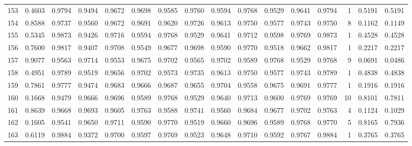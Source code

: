 \begin{tabular}{lrrrrrrrrrrrrrrr}
153 &      0.4603 &  0.9794 &  0.9494 &  0.9672 &  0.9698 &  0.9585 &  0.9760 &  0.9594 &  0.9768 &  0.9529 &   0.9641 &     0.9794 &      1 &                    0.5191 &                     0.5191 \\
154 &      0.8588 &  0.9737 &  0.9560 &  0.9672 &  0.9691 &  0.9620 &  0.9726 &  0.9613 &  0.9750 &  0.9577 &   0.9743 &     0.9750 &      8 &                    0.1162 &                     0.1149 \\
155 &      0.5345 &  0.9873 &  0.9426 &  0.9716 &  0.9594 &  0.9768 &  0.9529 &  0.9641 &  0.9712 &  0.9598 &   0.9769 &     0.9873 &      1 &                    0.4528 &                     0.4528 \\
156 &      0.7600 &  0.9817 &  0.9407 &  0.9708 &  0.9549 &  0.9677 &  0.9698 &  0.9590 &  0.9770 &  0.9518 &   0.9662 &     0.9817 &      1 &                    0.2217 &                     0.2217 \\
157 &      0.9077 &  0.9563 &  0.9714 &  0.9553 &  0.9675 &  0.9702 &  0.9565 &  0.9702 &  0.9589 &  0.9768 &   0.9529 &     0.9768 &      9 &                    0.0691 &                     0.0486 \\
158 &      0.4951 &  0.9789 &  0.9519 &  0.9656 &  0.9702 &  0.9573 &  0.9735 &  0.9613 &  0.9750 &  0.9577 &   0.9743 &     0.9789 &      1 &                    0.4838 &                     0.4838 \\
159 &      0.7861 &  0.9777 &  0.9474 &  0.9683 &  0.9666 &  0.9687 &  0.9655 &  0.9704 &  0.9558 &  0.9675 &   0.9691 &     0.9777 &      1 &                    0.1916 &                     0.1916 \\
160 &      0.1668 &  0.9479 &  0.9666 &  0.9696 &  0.9589 &  0.9768 &  0.9529 &  0.9640 &  0.9713 &  0.9600 &   0.9769 &     0.9769 &     10 &                    0.8101 &                     0.7811 \\
161 &      0.8639 &  0.9668 &  0.9693 &  0.9605 &  0.9763 &  0.9588 &  0.9741 &  0.9560 &  0.9684 &  0.9677 &   0.9702 &     0.9763 &      4 &                    0.1124 &                     0.1029 \\
162 &      0.1605 &  0.9541 &  0.9650 &  0.9711 &  0.9590 &  0.9770 &  0.9519 &  0.9660 &  0.9696 &  0.9589 &   0.9768 &     0.9770 &      5 &                    0.8165 &                     0.7936 \\
163 &      0.6119 &  0.9884 &  0.9372 &  0.9700 &  0.9597 &  0.9769 &  0.9523 &  0.9648 &  0.9710 &  0.9592 &   0.9767 &     0.9884 &      1 &                    0.3765 &                     0.3765 \\

\end{tabular}
